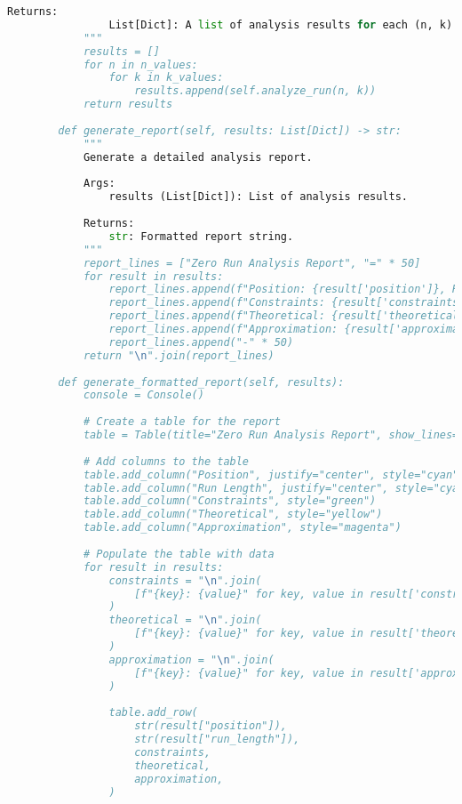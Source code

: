 \begin{lstlisting}[language=Python, style=pythonstyle, frame=single, caption={Zero Run Analysis Algorithm}]
            Returns:
                List[Dict]: A list of analysis results for each (n, k) pair.
            """
            results = []
            for n in n_values:
                for k in k_values:
                    results.append(self.analyze_run(n, k))
            return results
    
        def generate_report(self, results: List[Dict]) -> str:
            """
            Generate a detailed analysis report.
    
            Args:
                results (List[Dict]): List of analysis results.
    
            Returns:
                str: Formatted report string.
            """
            report_lines = ["Zero Run Analysis Report", "=" * 50]
            for result in results:
                report_lines.append(f"Position: {result['position']}, Run Length: {result['run_length']}")
                report_lines.append(f"Constraints: {result['constraints']}")
                report_lines.append(f"Theoretical: {result['theoretical']}")
                report_lines.append(f"Approximation: {result['approximation']}")
                report_lines.append("-" * 50)
            return "\n".join(report_lines)
    
        def generate_formatted_report(self, results):
            console = Console()
    
            # Create a table for the report
            table = Table(title="Zero Run Analysis Report", show_lines=True)
            
            # Add columns to the table
            table.add_column("Position", justify="center", style="cyan", no_wrap=True)
            table.add_column("Run Length", justify="center", style="cyan")
            table.add_column("Constraints", style="green")
            table.add_column("Theoretical", style="yellow")
            table.add_column("Approximation", style="magenta")
    
            # Populate the table with data
            for result in results:
                constraints = "\n".join(
                    [f"{key}: {value}" for key, value in result['constraints'].items()]
                )
                theoretical = "\n".join(
                    [f"{key}: {value}" for key, value in result['theoretical'].items()]
                )
                approximation = "\n".join(
                    [f"{key}: {value}" for key, value in result['approximation'].items()]
                )
    
                table.add_row(
                    str(result["position"]),
                    str(result["run_length"]),
                    constraints,
                    theoretical,
                    approximation,
                )
            

\end{lstlisting}
